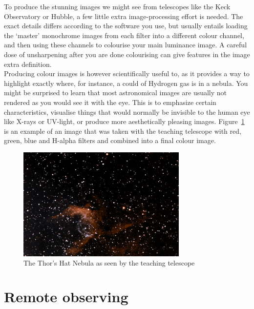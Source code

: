 \documentclass[12pt,twoside,a4paper]{report}
\begin{document}
To produce the stunning images we might see from telescopes like the Keck Observatory or Hubble, a few little extra image-processing effort is needed. The exact details differs according to the software you use, but usually entails loading the `master' monochrome images from each filter into a different colour channel, and then using these channels to colourise your main luminance image. A careful dose of unsharpening after you are done colourising can give features in the image extra definition.\\

Producing colour images is however scientifically useful to, as it provides a way to highlight exactly where, for instance, a could of Hydrogen gas is in a nebula. You might be surprised to learn that most astronomical images are usually not rendered as you would see it with the eye. This is to emphasize certain characteristics, visualise things that would normally be invisible to the human eye like X-rays or UV-light, or produce more aesthetically pleasing images. Figure~\ref{fig:thor} is an example of an image that was taken with the teaching telescope with red, green, blue and H-alpha filters and combined into a final colour image.\\

\begin{figure}[ht]
  \centering
    \includegraphics[width=0.75\textwidth]{documentation_images/thors_hat.jpg}
    \caption{\label{fig:thor}The Thor's Hat Nebula as seen by the teaching telescope}
 \end{figure}





\chapter{Remote observing}
\end{document}

